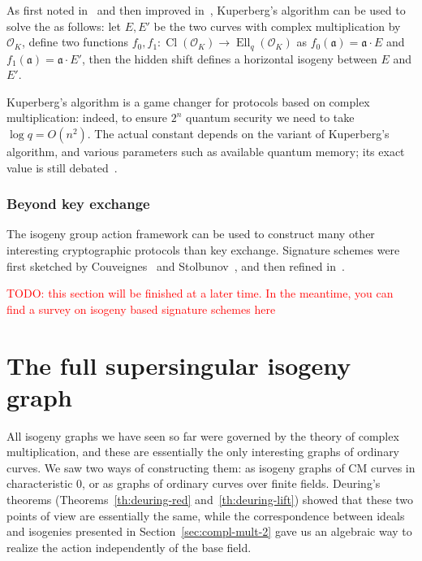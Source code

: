 \documentclass[10pt]{article}
\theoremstyle{plain}
\theoremstyle{definition}
\DeclareMathOperator{\Cl}{Cl}
\DeclareMathOperator{\Ell}{Ell}
\def\O{\ensuremath{\mathcal{O}}}
\def\a{\ensuremath{\mathfrak{a}}}
\begin{document}
As first noted in~\cite{childs2014constructing} and then improved
in~\cite{BIJ18,Jao-etal-kuperberg-2018,EC:BonSch20,EC:Peikert20},
Kuperberg's algorithm can be used to solve the  as
follows: let $E,E'$ be the two curves with complex multiplication by
$\O_K$, define two functions $f_0,f_1:\Cl(\O_K)\to\Ell_q(\O_K)$ as
$f_0(\a)=\a·E$ and $f_1(\a)=\a·E'$, then the hidden shift defines a
horizontal isogeny between $E$ and $E'$. %

Kuperberg's algorithm is a game changer for protocols based on complex
multiplication: indeed, to ensure $2^n$ quantum security we need to
take $\log q=O(n^2)$. %
The actual constant depends on the variant of Kuperberg's algorithm,
and various parameters such as available quantum memory; its exact
value is still
debated~\cite{EC:BLMP19,EC:Peikert20,cryptoeprint:2020:1520}.

\section{Beyond key exchange}
\label{sec:beyond-key-exchange}

The isogeny group action framework can be used to construct many other
interesting cryptographic protocols than key exchange. %
Signature schemes were first sketched by
Couveignes~\cite{EPRINT:Couveignes06} and
Stolbunov~\cite{Stolbunov2012}, and then refined
in~\cite{EC:DeFGal19,AC:BeuKleVer19}.

\textcolor{red}{TODO: this section will be finished at a later
  time. In the meantime, you can find a survey on isogeny based
  signature schemes here~\cite{isogpoksurvey}}



\clearpage
\part{The full supersingular isogeny graph}
\label{part:ssingular}

All isogeny graphs we have seen so far were governed by the theory of
complex multiplication, and these are essentially the only interesting
graphs of ordinary curves. %
We saw two ways of constructing them: as isogeny graphs of CM curves
in characteristic 0, or as graphs of ordinary curves over finite
fields. %
Deuring's theorems (Theorems~\ref{th:deuring-red}
and~\ref{th:deuring-lift}) showed that these two points of view are
essentially the same, while the correspondence between ideals and
isogenies presented in Section~\ref{sec:compl-mult-2} gave us an
algebraic way to realize the action independently of the base field.
\end{document}
